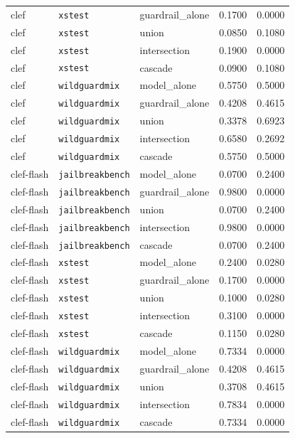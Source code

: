 \begin{table}[htbp]
\begin{tabular}{@{}lllrr@{}}
clef & \texttt{xstest} & guardrail\_alone & 0.1700 & 0.0000 \\
clef & \texttt{xstest} & union & 0.0850 & 0.1080 \\
clef & \texttt{xstest} & intersection & 0.1900 & 0.0000 \\
clef & \texttt{xstest} & cascade & 0.0900 & 0.1080 \\
clef & \texttt{wildguardmix} & model\_alone & 0.5750 & 0.5000 \\
clef & \texttt{wildguardmix} & guardrail\_alone & 0.4208 & 0.4615 \\
clef & \texttt{wildguardmix} & union & 0.3378 & 0.6923 \\
clef & \texttt{wildguardmix} & intersection & 0.6580 & 0.2692 \\
clef & \texttt{wildguardmix} & cascade & 0.5750 & 0.5000 \\
clef-flash & \texttt{jailbreakbench} & model\_alone & 0.0700 & 0.2400 \\
clef-flash & \texttt{jailbreakbench} & guardrail\_alone & 0.9800 & 0.0000 \\
clef-flash & \texttt{jailbreakbench} & union & 0.0700 & 0.2400 \\
clef-flash & \texttt{jailbreakbench} & intersection & 0.9800 & 0.0000 \\
clef-flash & \texttt{jailbreakbench} & cascade & 0.0700 & 0.2400 \\
clef-flash & \texttt{xstest} & model\_alone & 0.2400 & 0.0280 \\
clef-flash & \texttt{xstest} & guardrail\_alone & 0.1700 & 0.0000 \\
clef-flash & \texttt{xstest} & union & 0.1000 & 0.0280 \\
clef-flash & \texttt{xstest} & intersection & 0.3100 & 0.0000 \\
clef-flash & \texttt{xstest} & cascade & 0.1150 & 0.0280 \\
clef-flash & \texttt{wildguardmix} & model\_alone & 0.7334 & 0.0000 \\
clef-flash & \texttt{wildguardmix} & guardrail\_alone & 0.4208 & 0.4615 \\
clef-flash & \texttt{wildguardmix} & union & 0.3708 & 0.4615 \\
clef-flash & \texttt{wildguardmix} & intersection & 0.7834 & 0.0000 \\
clef-flash & \texttt{wildguardmix} & cascade & 0.7334 & 0.0000 \\
\bottomrule
\end{tabular}
\end{table}

